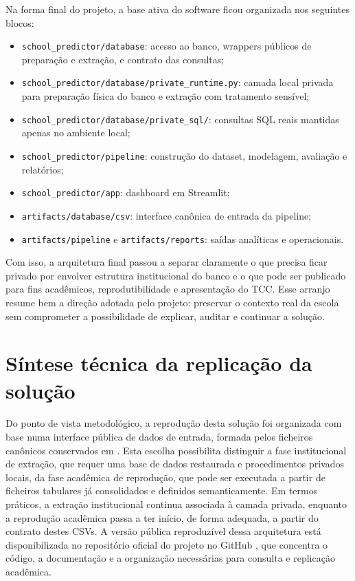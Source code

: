 Na forma final do projeto, a base ativa do software ficou organizada nos seguintes blocos:
\begin{itemize}
    \item \texttt{school\_predictor/database}: acesso ao banco, wrappers p\'ublicos de prepara\c{c}\~ao e extra\c{c}\~ao, e contrato das consultas;
    \item \texttt{school\_predictor/database/private\_runtime.py}: camada local privada para prepara\c{c}\~ao f\'isica do banco e extra\c{c}\~ao com tratamento sens\'ivel;
    \item \texttt{school\_predictor/database/private\_sql/}: consultas SQL reais mantidas apenas no ambiente local;
    \item \texttt{school\_predictor/pipeline}: constru\c{c}\~ao do dataset, modelagem, avalia\c{c}\~ao e relat\'orios;
    \item \texttt{school\_predictor/app}: dashboard em Streamlit;
    \item \texttt{artifacts/database/csv}: interface can\^onica de entrada da pipeline;
    \item \texttt{artifacts/pipeline} e \texttt{artifacts/reports}: sa\'idas anal\'iticas e operacionais.
\end{itemize}

Com isso, a arquitetura final passou a separar claramente o que precisa ficar privado por envolver estrutura institucional do banco e o que pode ser publicado para fins acad\^emicos, reprodutibilidade e apresenta\c{c}\~ao do TCC. Esse arranjo resume bem a dire\c{c}\~ao adotada pelo projeto: preservar o contexto real da escola sem comprometer a possibilidade de explicar, auditar e continuar a solu\c{c}\~ao.

\section{S\'intese t\'ecnica da replica\c{c}\~ao da solu\c{c}\~ao}
\label{sec:sintese-replicacao-tecnica}

Do ponto de vista metodol\'ogico, a reprodu\c{c}\~ao desta solu\c{c}\~ao foi organizada com base numa interface p\'ublica de dados de entrada, formada pelos ficheiros can\^onicos conservados em . Esta escolha possibilita distinguir a fase institucional de extra\c{c}\~ao, que requer uma base de dados restaurada e procedimentos privados locais, da fase acad\^emica de reprodu\c{c}\~ao, que pode ser executada a partir de ficheiros tabulares j\'a consolidados e definidos semanticamente. Em termos pr\'aticos, a extra\c{c}\~ao institucional continua associada \`a camada privada, enquanto a reprodu\c{c}\~ao acad\^emica passa a ter in\'icio, de forma adequada, a partir do contrato destes CSVs. A vers\~ao p\'ublica reproduz\'ivel dessa arquitetura est\'a disponibilizada no reposit\'orio oficial do projeto no GitHub \cite{schoolpredictorgithub}, que concentra o c\'odigo, a documenta\c{c}\~ao e a organiza\c{c}\~ao necess\'arias para consulta e replica\c{c}\~ao acad\^emica.

